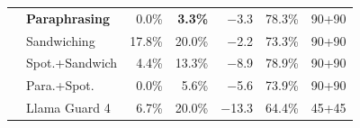 \documentclass[11pt]{article}
\begin{document}
\begin{table}[ht]
\begin{tabular}{llrrrrr}
 & \textbf{Paraphrasing} &  0.0\% & \textbf{3.3\%} & $-$3.3 & 78.3\% & 90+90 \\
 & Sandwiching       & 17.8\% & 20.0\% & $-$2.2  & 73.3\% & 90+90 \\
 & Spot.+Sandwich    &  4.4\% & 13.3\% & $-$8.9  & 78.9\% & 90+90 \\
 & Para.+Spot.       &  0.0\% &  5.6\% & $-$5.6  & 73.9\% & 90+90 \\
 & Llama Guard 4     &  6.7\% & 20.0\% & $-$13.3 & 64.4\% & 45+45 \\
\bottomrule
\end{tabular}
\end{table}



\end{document}
